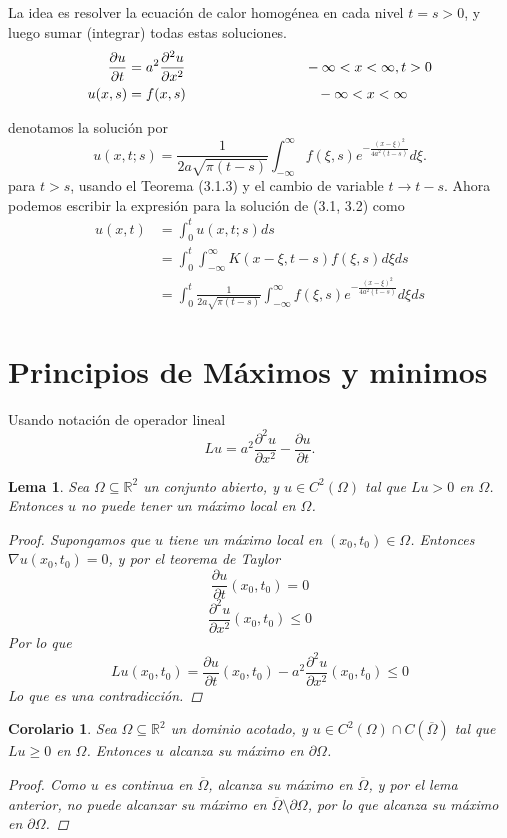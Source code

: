 \documentclass[11pt]{book}
\theoremstyle{plain}
\newtheorem{lema}[proposición]{Lema}
\newtheorem{coro}[proposición]{Corolario}
\theoremstyle{definition}
\newcommand{\R}{\mathbb{R}}
\begin{document}
La idea es resolver la ecuación de calor homogénea en cada nivel $t = s > 0$, y luego sumar (integrar) todas estas soluciones.
\begin{align}
    \frac{\partial u}{\partial t} &= a^{2} \frac{\partial^2 u}{\partial x^2} \hspace{30mm} -\infty<x<\infty, t > 0\\ 
    u(x,s)&= f(x,s) \hspace{33mm} -\infty<x<\infty
\end{align}

denotamos la solución por
\[
u(x,t;s) = \frac{1}{2a\sqrt{\pi (t-s)}}\int_{-\infty}^{\infty}f(\xi,s)e^{-\frac{(x-\xi)^{2}}{4a^{2}(t-s)}}d\xi
.\]
para $t>s$, usando el Teorema (3.1.3) y el cambio de variable $t \to t-s$. Ahora podemos escribir la expresión para la solución de (3.1, 3.2) como 
\begin{align}
u(x,t) &= \int_{0}^{t} u(x,t;s)ds\\
&= \int_{0}^{t} \int_{-\infty}^{\infty} K(x-\xi,t-s)f(\xi,s)d\xi ds\\
&= \int_{0}^{t} \frac{1}{2a\sqrt{\pi (t-s)}}\int_{-\infty}^{\infty}f(\xi,s)e^{-\frac{(x-\xi)^{2}}{4a^{2}(t-s)}}d\xi ds
\end{align}

\section{Principios de Máximos y minimos}
Usando notación de operador lineal
\[
L u = a^{2} \frac{\partial^2 u}{\partial x^2} - \frac{\partial u}{\partial t}
.\]
\begin{lema}
    Sea $\Omega \subseteq \R^{2}$ un conjunto abierto, y $u \in C^{2}(\Omega)$ tal que $Lu > 0$ en $\Omega$. Entonces $u$ no puede tener un máximo local en $\Omega$.
    \begin{proof}
        Supongamos que $u$ tiene un máximo local en $(x_{0},t_{0}) \in \Omega$. Entonces $\nabla u(x_{0},t_{0}) = 0$, y por el teorema de Taylor
        \[
            \frac{\partial u}{\partial t}(x_{0},t_{0}) = 0
        \]
        \[
            \frac{\partial^2 u}{\partial x^2}(x_{0},t_{0}) \leq 0
        \]
        Por lo que
        \[
            Lu(x_{0},t_{0}) = \frac{\partial u}{\partial t}(x_{0},t_{0}) - a^{2} \frac{\partial^2 u}{\partial x^2}(x_{0},t_{0}) \leq 0
        \]
        Lo que es una contradicción.
    \end{proof}
\end{lema}

\begin{coro}
    Sea $\Omega \subseteq \R^{2}$ un dominio acotado, y $u \in C^{2}(\Omega)\cap C(\overline{\Omega})$ tal que $Lu \geq 0$ en $\Omega$. Entonces $u$ alcanza su máximo en $\partial \Omega$.
    \begin{proof}
        Como $u$ es continua en $\overline{\Omega}$, alcanza su máximo en $\overline{\Omega}$, y por el lema anterior, no puede alcanzar su máximo en $\overline{\Omega} \setminus \partial \Omega$, por lo que alcanza su máximo en $\partial \Omega$.
    \end{proof}
\end{coro}
\end{document}
